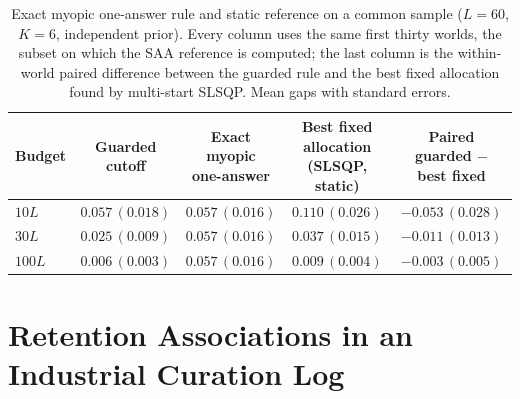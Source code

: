 \documentclass[11pt]{article}
\theoremstyle{definition}
\theoremstyle{remark}
\newcommand{\1}{\mathbf{1}}
\begin{document}
\begin{table}[h!]
\centering
\scriptsize
\setlength{\tabcolsep}{5pt}
\begin{tabular}{lcccc}
\toprule
Budget & Guarded cutoff & \shortstack{Exact myopic\\one-answer} & \shortstack{Best fixed allocation\\(SLSQP, static)} & \shortstack{Paired guarded\\$-$ best fixed} \\
\midrule
$10L$  & $0.057\,(0.018)$ & $0.057\,(0.016)$ & $0.110\,(0.026)$ & $-0.053\,(0.028)$ \\
$30L$  & $0.025\,(0.009)$ & $0.057\,(0.016)$ & $0.037\,(0.015)$ & $-0.011\,(0.013)$ \\
$100L$ & $0.006\,(0.003)$ & $0.057\,(0.016)$ & $0.009\,(0.004)$ & $-0.003\,(0.005)$ \\
\bottomrule
\end{tabular}
\caption{Exact myopic one-answer rule and static reference on a common sample (\(L=60\), \(K=6\), independent prior). Every column uses the same first thirty worlds, the subset on which the SAA reference is computed; the last column is the within-world paired difference between the guarded rule and the best fixed allocation found by multi-start SLSQP. Mean gaps with standard errors.}
\label{tab:exact-rule}
\end{table}

\section{Retention Associations in an Industrial Curation Log}
\label{app:retention-drivers}
\end{document}
